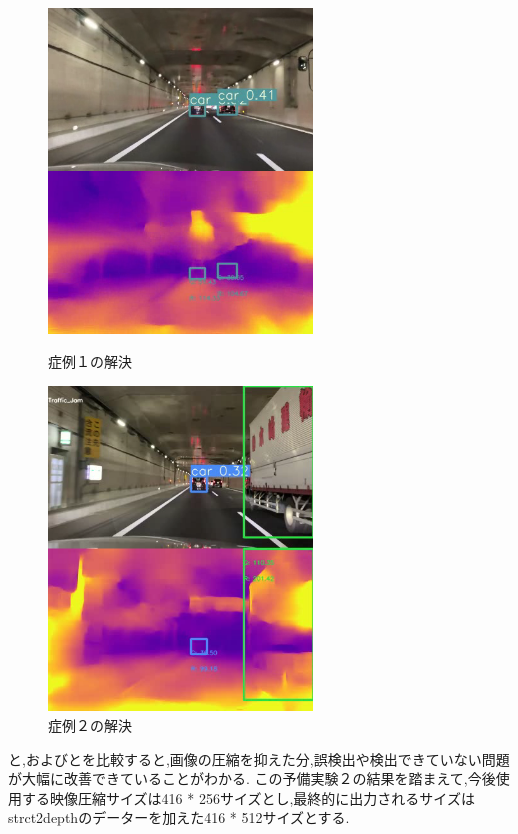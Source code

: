 \begin{figure}[htbp]
  \begin{minipage}{0.5\hsize}
   \begin{center}
    \includegraphics[width=7cm]{figs/pre1_after.png}
   \end{center}
   \caption{症例１の解決}
   \label{fig:pre2after1}
  \end{minipage}
  \begin{minipage}{0.5\hsize}
  \begin{center}
   \includegraphics[width=7cm]{figs/pre1_after2.png}
  \end{center}
   \caption{症例２の解決}
   \label{fig:pre2after2}
  \end{minipage}
 \end{figure}

と,およびとを比較すると,画像の圧縮を抑えた分,誤検出や検出できていない問題が大幅に改善できていることがわかる.
この予備実験２の結果を踏まえて,今後使用する映像圧縮サイズは416 * 256サイズとし,最終的に出力されるサイズはstrct2depthのデーターを加えた416 * 512サイズとする.

